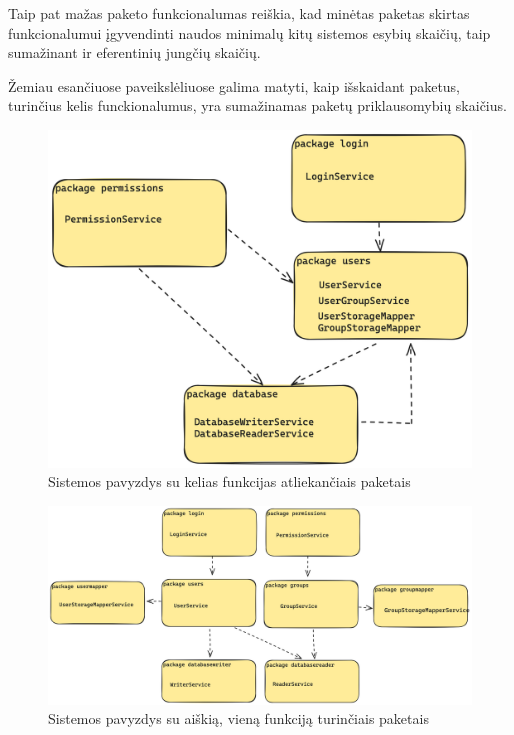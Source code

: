 Taip pat mažas paketo funkcionalumas reiškia, kad minėtas paketas skirtas funkcionalumui įgyvendinti naudos minimalų kitų sistemos esybių skaičių,
taip sumažinant ir eferentinių jungčių skaičių.

Žemiau esančiuose paveikslėliuose galima matyti, kaip išskaidant paketus, turinčius kelis funckionalumus, yra sumažinamas paketų
priklausomybių skaičius.
\begin{figure}[H]
    \centering
    \includegraphics[scale=0.15]{img/excesive_deps}
    \caption{Sistemos pavyzdys su kelias funkcijas atliekančiais paketais}
    \label{img:excesive_deps}
\end{figure}


\begin{figure}[H]
    \centering
    \includegraphics[scale=0.13]{img/good_deps}
    \caption{Sistemos pavyzdys su aiškią, vieną funkciją turinčiais paketais}
    \label{img:good_deps}
\end{figure}



